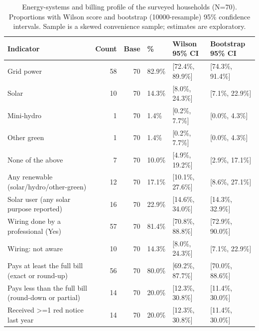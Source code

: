 \begin{table}
\caption{Energy-systems and billing profile of the surveyed households (N=70). Proportions with Wilson score and bootstrap (10000-resample) 95\% confidence intervals. Sample is a skewed convenience sample; estimates are exploratory.}
\label{tab:energy_systems_summary}
\begin{tabular}{lrrlll}
\toprule
Indicator & Count & Base & \% & Wilson 95\% CI & Bootstrap 95\% CI \\
\midrule
Grid power & 58 & 70 & 82.9\% & [72.4\%, 89.9\%] & [74.3\%, 91.4\%] \\
Solar & 10 & 70 & 14.3\% & [8.0\%, 24.3\%] & [7.1\%, 22.9\%] \\
Mini-hydro & 1 & 70 & 1.4\% & [0.2\%, 7.7\%] & [0.0\%, 4.3\%] \\
Other green & 1 & 70 & 1.4\% & [0.2\%, 7.7\%] & [0.0\%, 4.3\%] \\
None of the above & 7 & 70 & 10.0\% & [4.9\%, 19.2\%] & [2.9\%, 17.1\%] \\
Any renewable (solar/hydro/other-green) & 12 & 70 & 17.1\% & [10.1\%, 27.6\%] & [8.6\%, 27.1\%] \\
Solar user (any solar purpose reported) & 16 & 70 & 22.9\% & [14.6\%, 34.0\%] & [14.3\%, 32.9\%] \\
Wiring done by a professional (Yes) & 57 & 70 & 81.4\% & [70.8\%, 88.8\%] & [72.9\%, 90.0\%] \\
Wiring: not aware & 10 & 70 & 14.3\% & [8.0\%, 24.3\%] & [7.1\%, 22.9\%] \\
Pays at least the full bill (exact or round-up) & 56 & 70 & 80.0\% & [69.2\%, 87.7\%] & [70.0\%, 88.6\%] \\
Pays less than the full bill (round-down or partial) & 14 & 70 & 20.0\% & [12.3\%, 30.8\%] & [11.4\%, 30.0\%] \\
Received >=1 red notice last year & 14 & 70 & 20.0\% & [12.3\%, 30.8\%] & [11.4\%, 30.0\%] \\
\bottomrule
\end{tabular}
\end{table}
